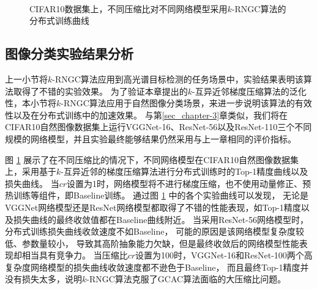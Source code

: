 \documentclass{xdupgthesis}
\begin{document}
\begin{figure}[H]
{        \label{fig_Result-k-rngc-resnet110-loss}
    } \\
    \caption{CIFAR10数据集上，不同压缩比对不同网络模型采用$k$-RNGC算法的分布式训练曲线}
    \label{fig_Result-k-rngc-CIFAR10}
\end{figure}

\subsection{图像分类实验结果分析}
上一小节将$k$-RNGC算法应用到高光谱目标检测的任务场景中，实验结果表明该算法取得了不错的实验效果。
为了验证本章提出的$k$-互异近邻梯度压缩算法的泛化性，本小节将$k$-RNGC算法应用于自然图像分类场景，来进一步说明该算法的有效性以及在分布式训练中的加速效果。
与第\ref*{sec_chapter-3}章类似，我们将在CIFAR10自然图像数据集上运行VGGNet-16、ResNet-56以及ResNet-110三个不同规模的网络模型，并且实验最终能够结果仍然采用与上一章相同的评价指标。

图 \ref*{fig_Result-k-rngc-CIFAR10} 展示了在不同压缩比的情况下，不同网络模型在CIFAR10自然图像数据集上，采用基于$k$-互异近邻的梯度压缩算法进行分布式训练时的Top-1精度曲线以及损失曲线。
当$cr$设置为1时，网络模型将不进行梯度压缩，也不使用动量修正、预热训练等组件，即Baseline训练。
通过图 \ref*{fig_Result-k-rngc-CIFAR10} 中的各个实验曲线可以发现，
无论是VGGNet网络模型还是ResNet网络模型都取得了不错的性能表现，如Top-1精度以及损失曲线的最终收敛值都在Baseline曲线附近。
当采用ResNet-56网络模型时，分布式训练损失曲线收敛速度不如Baseline，
可能的原因是该网络模型复杂度较低、参数量较小，
导致其高阶抽象能力欠缺，但是最终收敛后的网络模型性能表现却相当具有竞争力。
当压缩比$cr$设置为100时，VGGNet-16和ResNet-100两个高复杂度网络模型的损失曲线收敛速度都不逊色于Baseline，
而且最终Top-1精度并没有损失太多，说明$k$-RNGC算法克服了GCAC算法面临的大压缩比问题。
\end{document}
